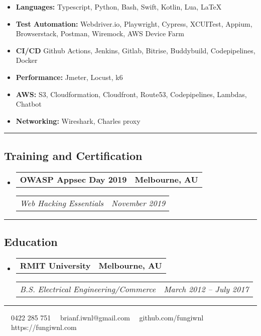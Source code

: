 \documentclass[11pt,letterpaper]{article}
\makeatletter
\newcommand{\headerrow}[2]
{\begin{tabular*}{\linewidth}{l@{\extracolsep{\fill}}r}
#1 &
#2 \\
\end{tabular*}}
\makeatother
\begin{document}
\begin{itemize}[leftmargin=1em,noitemsep]
	\item \textbf{Languages:}
	      Typescript, Python, Bash, Swift, Kotlin, Lua, \LaTeX
	\item \textbf{Test Automation:}
	    Webdriver.io, Playwright, Cypress, XCUITest, Appium, Browserstack, Postman, Wiremock, AWS Device Farm
	\item \textbf{CI/CD} Github Actions, Jenkins, Gitlab, Bitrise, Buddybuild, Codepipelines, Docker
	\item \textbf{Performance:} Jmeter, Locust, k6
    \item \textbf{AWS:} S3, Cloudformation, Cloudfront, Route53, Codepipelines, Lambdas, Chatbot
    \item \textbf{Networking:} Wireshark, Charles proxy 
\end{itemize}

\hrule
\vspace{-1em}
\subsection*{\Large Training and Certification}

\begin{itemize}[leftmargin=1em]
	\parskip=0.1em
		
	\item
	      \headerrow
	      {\textbf{OWASP Appsec Day 2019}}
	      {\textbf{Melbourne, AU}}
	      \headerrow
	      {\emph{Web Hacking Essentials}}
	      {\emph{November 2019}}
	      	      
\end{itemize}

\hrule
\vspace{-1em}
\subsection*{\Large Education}

\begin{itemize}[leftmargin=1em]
	\parskip=0.1em
		
	\item
	      \headerrow
	      {\textbf{RMIT University}}
	      {\textbf{Melbourne, AU}}
	      \headerrow
	      {\emph{B.S. Electrical Engineering/Commerce}}
	      {\emph{March 2012 -- July 2017}}
	      	      
\end{itemize}

\hrule
\vspace{-1em}
\begin{center}
	\vspace{0.8cm}
	\raisebox{-0.2\height} {\Large \faPhoneSquare} \ \  0422 285 751 \hfill\raisebox{-0.2\height}{\Large \faEnvelopeSquare} \ \ brianf.iwnl@gmail.com \hfill \raisebox{-0.2\height}{\Large \faGithubSquare} \ \ github.com/fungiwnl \hfill \raisebox{-0.2\height}{\Large \faGlobe} \ \ https://fungiwnl.com
\end{center}
\end{document}
